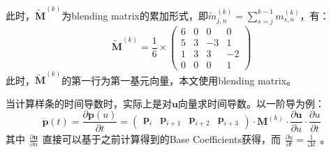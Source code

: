 \documentclass[12pt, onecolumn]{article}
\begin{document}
	此时，$\boldsymbol{\widetilde{M}}^{(k)}$为blending matrix的累加形式，即$\widetilde{m}^{(k)}_{j,n}=\sum_{s=j}^{k-1}m^{(k)}_{s,n}$，有：
	\begin{equation}
	\boldsymbol{\widetilde{M}}^{(k)}=\frac{1}{6}\times\begin{pmatrix}
		 6&  0&  0 & 0\\
		 5 & 3& -3 & 1\\
		 1&  3&  3 &-2\\
		 0 & 0&  0 & 1
		\end{pmatrix}
	\end{equation}
	此时，$\boldsymbol{\widetilde{M}}^{(k)}$的第一行为第一基元向量，本文使用blending matrix。
	
	当计算样条的时间导数时，实际上是对$\boldsymbol{u}$向量求时间导数。以一阶导为例：
	\begin{equation}
	\dot{\boldsymbol{p}}(t)=\frac{\partial \boldsymbol{p}(u)}{\partial t}=
	\begin{pmatrix}
		\boldsymbol{p}_i&\boldsymbol{p}_{i+1}&\boldsymbol{p}_{i+2}&\boldsymbol{p}_{i+3}
		\end{pmatrix}\cdot\boldsymbol{M}^{(k)}\cdot\frac{\partial \boldsymbol{u}}{\partial u}\cdot\frac{\partial u}{\partial t}
	\end{equation}
	其中$\begin{aligned}
	\frac{\partial \boldsymbol{u}}{\partial u}
	\end{aligned}$直接可以基于之前计算得到的Base Coefficients获得，而$\begin{aligned}
	\frac{\partial u}{\partial t}=\frac{1}{\Delta t}
	\end{aligned}$。
	
	
	
	
	
	
	
	
	
	
	
	
	\newpage
\end{document}

